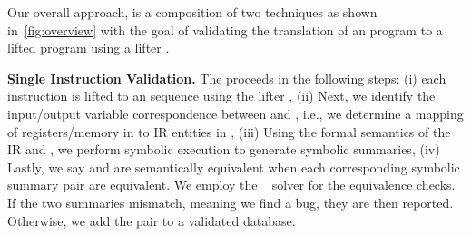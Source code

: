 
Our overall approach, is a composition of two techniques as shown
in~\ref{fig:overview} with the goal of validating the 
translation of an \ISA program  to a lifted \LLVM program  using a 
lifter .

\textbf{Single Instruction Validation.} The \siv proceeds in the following
steps: (i) each \ISA instruction  is lifted to an \LLVM sequence 
using the lifter , (ii) Next, we identify the input/output variable
correspondence between  and , i.e., we determine a mapping of
registers/memory in  to IR entities in ,  (iii) Using the formal
semantics of the IR and \ISA, we perform symbolic execution to generate
symbolic summaries, (iv) Lastly, we say  and  are semantically
equivalent when each corresponding symbolic summary pair are equivalent. We
employ the \Z~\cite{z3:2008} solver for the equivalence checks. If the two
summaries mismatch, meaning we find a bug, they are then reported.  Otherwise,
we add the pair  to a validated database.

